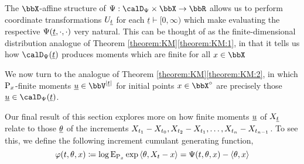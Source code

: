 

The $\stateSpace$-affine structure of $\aff: \momentSpace \times \stateSpace \rightarrow \bbR$ allows us to perform coordinate transformations $U_{\underline t}$ for each $\underline t \vdash [0,\infty)$ which make evaluating the respective $\Psi(\underline t, \cdot, \cdot)$ very natural.
This can be thought of as the finite-dimensional distribution analogue of Theorem \ref{theorem:KM}\ref{theorem:KM:1}, in that it tells us how $\momentSpace(\underline t)$ produces moments which are finite for all $\stateVar \in \stateSpace$



We now turn to the analogue of Theorem \ref{theorem:KM}\ref{theorem:KM:2}, in which ${\operatorname{P}}_x$-finite moments $\underline\momentVar \in \vecSpace^{|\underline t|}$ for initial points $\stateVar \in \stateSpace^\circ$ are precisely those $\underline\momentVar \in \momentSpace(\underline t)$.



Our final result of this section explores more on how finite moments $\underline{u}$ of $X_{\underline t}$ relate to those $\underline{\theta}$ of the increments $X_{t_1}-X_{t_0}, X_{t_2} - X_{t_1}, \ldots, X_{t_n} - X_{t_{n-1}}$.
To see this, we define the following increment cumulant generating function,
\begin{equation*}
  \varphi(t, \theta, x) \coloneqq \log{\operatorname{E}}_{{\operatorname{P}}_x}\exp{\langle \theta, X_t-x\rangle} = \Psi(t, \theta, x) - {\langle \theta , x \rangle}
\end{equation*}


